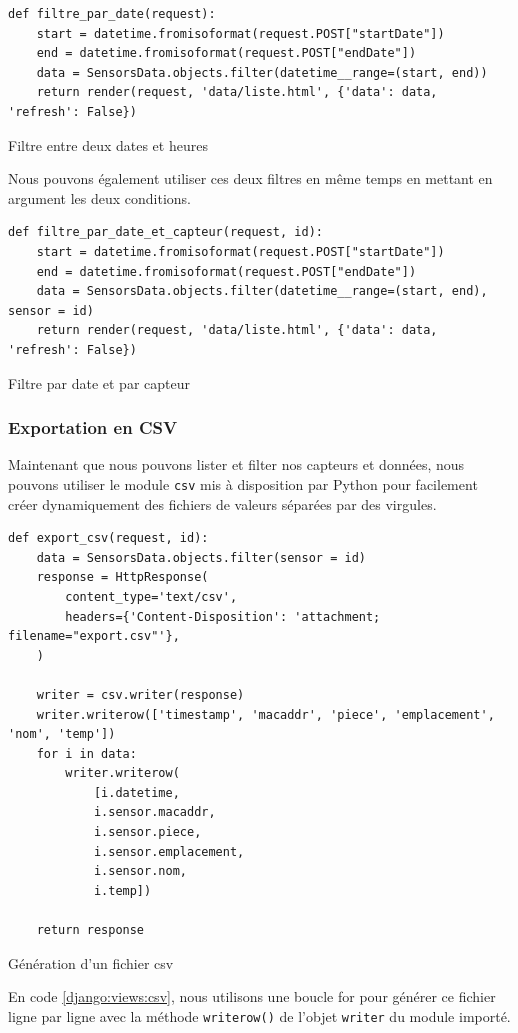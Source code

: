 \documentclass{article}
\begin{document}
\begin{listing}[H]
    \begin{verbatim}
def filtre_par_date(request):
    start = datetime.fromisoformat(request.POST["startDate"])
    end = datetime.fromisoformat(request.POST["endDate"])
    data = SensorsData.objects.filter(datetime__range=(start, end))
    return render(request, 'data/liste.html', {'data': data, 'refresh': False})
    \end{verbatim}
    \caption{Filtre entre deux dates et heures}
    \label{django:views:filtre2}
\end{listing}
Nous pouvons également utiliser ces deux filtres en même temps en mettant en argument les deux conditions.

\begin{listing}[H]
    \begin{verbatim}
def filtre_par_date_et_capteur(request, id):
    start = datetime.fromisoformat(request.POST["startDate"])
    end = datetime.fromisoformat(request.POST["endDate"])
    data = SensorsData.objects.filter(datetime__range=(start, end), sensor = id) 
    return render(request, 'data/liste.html', {'data': data, 'refresh': False})
    \end{verbatim}
    \caption{Filtre par date et par capteur}
    \label{django:views:filtre3}
\end{listing}

\subsubsection{Exportation en CSV}
Maintenant que nous pouvons lister et filter nos capteurs et données, nous pouvons utiliser le module \verb|csv| mis à disposition par Python pour facilement créer dynamiquement des fichiers de valeurs séparées par des virgules.
\begin{listing}[H]
    \begin{verbatim}
def export_csv(request, id):
    data = SensorsData.objects.filter(sensor = id)
    response = HttpResponse(
        content_type='text/csv',
        headers={'Content-Disposition': 'attachment; filename="export.csv"'},
    )

    writer = csv.writer(response)
    writer.writerow(['timestamp', 'macaddr', 'piece', 'emplacement', 'nom', 'temp'])
    for i in data:
        writer.writerow(
            [i.datetime, 
            i.sensor.macaddr, 
            i.sensor.piece,
            i.sensor.emplacement,
            i.sensor.nom,
            i.temp])

    return response
    \end{verbatim}
    \caption{Génération d'un fichier csv}
    \label{django:views:csv}
\end{listing} 
En code \ref{django:views:csv}, nous utilisons une boucle for pour générer ce fichier ligne par ligne avec la méthode \verb|writerow()| de l'objet \verb|writer| du module importé.
\end{document}
